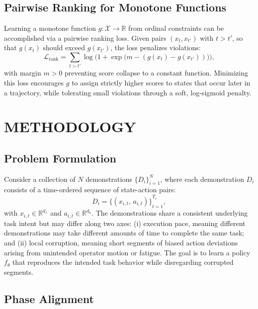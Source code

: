\documentclass[a4paper, 10pt, conference]{ieeeconf}
\begin{document}
\subsection{Pairwise Ranking for Monotone Functions}

Learning a monotone function $g : \mathcal{X} \to \mathbb{R}$ from ordinal constraints can be accomplished via a pairwise ranking loss.
Given pairs $(x_t, x_{t'})$ with $t > t'$, so that $g(x_t)$ should exceed $g(x_{t'})$, the loss penalizes violations:
\begin{equation}
    \mathcal{L}_{\mathrm{rank}} = \sum_{t > t'} \log\!\bigl(1 + \exp\!\bigl(m - (g(x_t) - g(x_{t'}))\bigr)\bigr),
\end{equation}
with margin $m > 0$ preventing score collapse to a constant function.
Minimizing this loss encourages $g$ to assign strictly higher scores to states that occur later in a trajectory, while tolerating small violations through a soft, log-sigmoid penalty.

\section{METHODOLOGY}

\subsection{Problem Formulation}

Consider a collection of $N$ demonstrations ${\{D_i\}}_{i=1}^N$, where each demonstration $D_i$ consists of a time-ordered sequence of state-action pairs:
\begin{equation}
    D_i = {\{(x_{i,t},\, a_{i,t})\}}_{t=1}^{T_i},
\end{equation}
with $x_{i,t} \in \mathbb{R}^{d_x}$ and $a_{i,t} \in \mathbb{R}^{d_a}$.
The demonstrations share a consistent underlying task intent but may differ along two axes: (i) execution pace, meaning different demonstrations may take different amounts of time to complete the same task; and (ii) local corruption, meaning short segments of biased action deviations arising from unintended operator motion or fatigue.
The goal is to learn a policy $f_\theta$ that reproduces the intended task behavior while disregarding corrupted segments.

\subsection{Phase Alignment}
\end{document}
